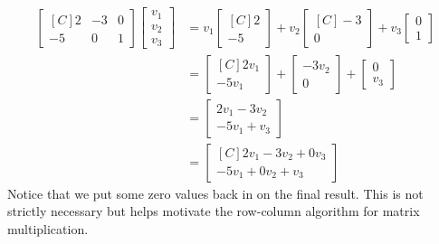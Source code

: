 \begin{example}\label{ex:mv_mult_by_def_gen}
\begin{align*}
\begin{bmatrix*}[C]
2 & -3 & 0 \\
-5 & 0 & 1 
\end{bmatrix*}
\begin{bmatrix}v_1\\ v_2 \\ v_3 \end{bmatrix}
&=v_1\begin{bmatrix*}[C]2\\-5 \end{bmatrix*}
+v_2\begin{bmatrix*}[C]-3 \\0\end{bmatrix*}
+v_3\begin{bmatrix}0\\1\end{bmatrix}\\
&=\begin{bmatrix*}[C]2v_1\\-5v_1\end{bmatrix*}
+\begin{bmatrix}-3v_2\\ 0\end{bmatrix} 
+\begin{bmatrix}0\\v_3\end{bmatrix}\\
&=\begin{bmatrix}2v_1-3v_2\\-5v_1+v_3\end{bmatrix}\\
&=\begin{bmatrix*}[C]2v_1-3v_2+0v_3\\-5v_1+0v_2+v_3\end{bmatrix*}
\end{align*}
Notice that we put some zero values back in on the final result. This is not 
strictly necessary but helps motivate the row-column algorithm for matrix 
multiplication.
\end{example}

